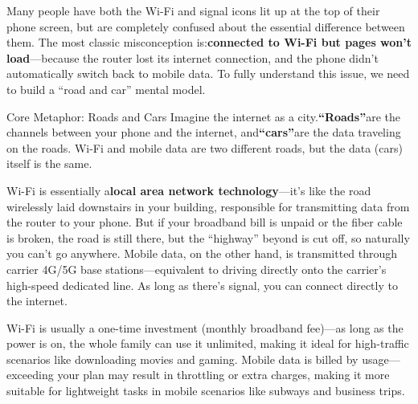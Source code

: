 


Many people have both the Wi-Fi and signal icons lit up at the top of their phone screen, but are completely confused about the essential difference between them. The most classic misconception is:\textbf{connected to Wi-Fi but pages won't load}—because the router lost its internet connection, and the phone didn't automatically switch back to mobile data. To fully understand this issue, we need to build a “road and car” mental model.

\begin{tcbinfo}{Core Metaphor: Roads and Cars}
Imagine the internet as a city.\textbf{“Roads”}are the channels between your phone and the internet, and\textbf{“cars”}are the data traveling on the roads. Wi-Fi and mobile data are two different roads, but the data (cars) itself is the same.

\end{tcbinfo}


Wi-Fi is essentially a\textbf{local area network technology}—it's like the road wirelessly laid downstairs in your building, responsible for transmitting data from the router to your phone. But if your broadband bill is unpaid or the fiber cable is broken, the road is still there, but the “highway” beyond is cut off, so naturally you can't go anywhere. Mobile data, on the other hand, is transmitted through carrier 4G/5G base stations—equivalent to driving directly onto the carrier's high-speed dedicated line. As long as there's signal, you can connect directly to the internet.


Wi-Fi is usually a one-time investment (monthly broadband fee)—as long as the power is on, the whole family can use it unlimited, making it ideal for high-traffic scenarios like downloading movies and gaming. Mobile data is billed by usage—exceeding your plan may result in throttling or extra charges, making it more suitable for lightweight tasks in mobile scenarios like subways and business trips.

